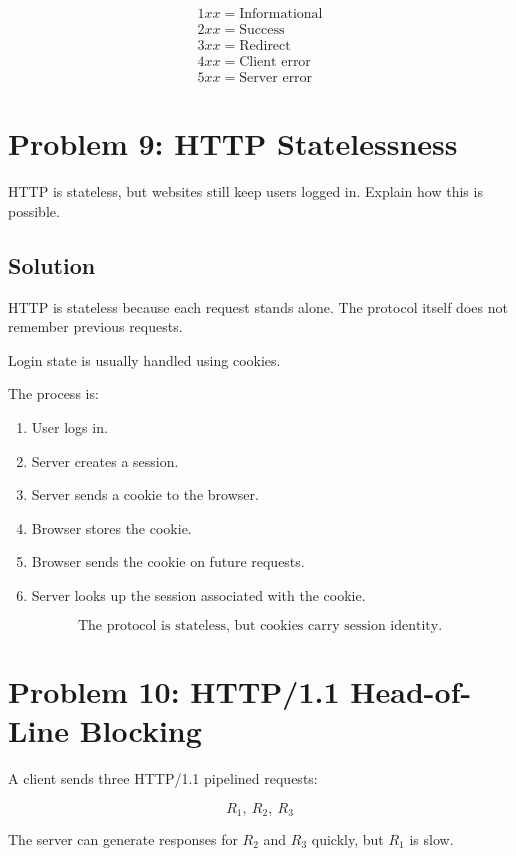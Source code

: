 \documentclass[12pt]{article}
\begin{document}
\[
\boxed{
\begin{array}{l}
1xx = \text{Informational} \\
2xx = \text{Success} \\
3xx = \text{Redirect} \\
4xx = \text{Client error} \\
5xx = \text{Server error}
\end{array}
}
\]

\section*{Problem 9: HTTP Statelessness}

HTTP is stateless, but websites still keep users logged in. Explain how this is possible.

\subsection*{Solution}

HTTP is stateless because each request stands alone. The protocol itself does not remember previous requests.

Login state is usually handled using cookies.

The process is:

\begin{enumerate}
    \item User logs in.
    \item Server creates a session.
    \item Server sends a cookie to the browser.
    \item Browser stores the cookie.
    \item Browser sends the cookie on future requests.
    \item Server looks up the session associated with the cookie.
\end{enumerate}

\[
\boxed{\text{The protocol is stateless, but cookies carry session identity.}}
\]

\section*{Problem 10: HTTP/1.1 Head-of-Line Blocking}

A client sends three HTTP/1.1 pipelined requests:

\[
R_1,\ R_2,\ R_3
\]

The server can generate responses for \(R_2\) and \(R_3\) quickly, but \(R_1\) is slow.
\end{document}
